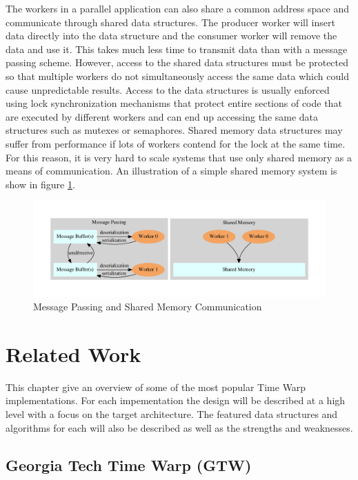 \documentclass[11pt]{book}
\begin{document}
The workers in a parallel application can also share a common address space and communicate
through shared data structures. The producer worker will insert data directly into the data
structure and the consumer worker will remove the data and use it. This takes much less time
to transmit data than with a message passing scheme. However, access to the shared data
structures must be protected so that multiple workers do not simultaneously access the same
data which could cause unpredictable results. Access to the data structures is usually enforced
using lock synchronization mechanisms that protect entire sections of code that are executed by
different workers and can end up accessing the same data structures such as mutexes or semaphores.
Shared memory data structures may suffer from performance if lots of workers contend for the
lock at the same time. For this reason, it is very hard to scale systems that use only shared
memory as a means of communication. An illustration of a simple shared memory system is show
in figure \ref{communication}.

\begin{figure}[H]
    \centering
    \includegraphics[width=\textwidth]{figs/graphviz/parallel_communication.pdf}
    \caption{Message Passing and Shared Memory Communication}\label{communication}
\end{figure}



\chapter{Related Work}\label{related_work}

This chapter give an overview of some of the most popular Time Warp implementations. For each
impementation the design will be described at a high level with a focus on the target
architecture. The featured data structures and algorithms for each will also be described
as well as the strengths and weaknesses.

\section{Georgia Tech Time Warp (GTW)}
\end{document}
